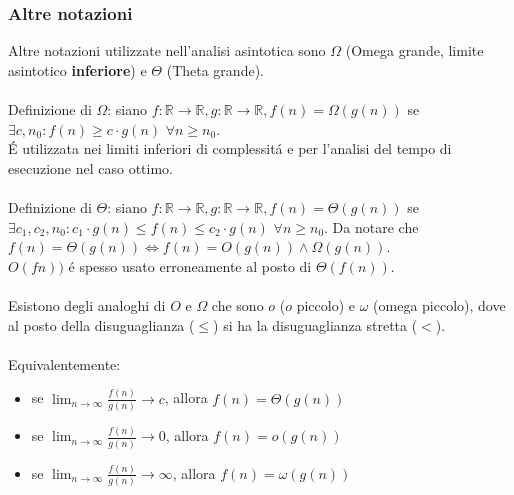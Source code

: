 \documentclass{article}
\begin{document}
\subsubsection{Altre notazioni}
Altre notazioni utilizzate nell'analisi asintotica sono $\Omega$ (Omega grande, limite asintotico \textbf{inferiore}) e $\Theta$ (Theta grande).\\\\
Definizione di $\Omega$: siano $f : \mathbb{R} \to \mathbb{R}, g : \mathbb{R} \to \mathbb{R}, f(n) = \Omega(g(n))$ se $\exists c, n_0 : f(n) \ge c \cdot g(n)$ $\forall n \ge n_0$.\\
É utilizzata nei limiti inferiori di complessitá e per l'analisi del tempo di esecuzione nel caso ottimo.\\\\
Definizione di $\Theta$: siano $f : \mathbb{R} \to \mathbb{R}, g : \mathbb{R} \to \mathbb{R}, f(n) = \Theta(g(n))$ se $\exists c_1, c_2, n_0 : c_1 \cdot g(n) \le f(n) \le c_2 \cdot g(n)$ $\forall n \ge n_0$. Da notare che $f(n) = \Theta(g(n)) \iff f(n) = O(g(n)) \wedge \Omega(g(n))$.\\
$O(fn))$ é spesso usato erroneamente al posto di $\Theta(f(n))$.\\\\
Esistono degli analoghi di $O$ e $\Omega$ che sono $o$ ($o$ piccolo) e $\omega$ (omega piccolo), dove al posto della disuguaglianza ($\le$) si ha la disuguaglianza stretta ($<$).\\\\
Equivalentemente:
\begin{itemize}
	\item[] se $\displaystyle \lim_{n \to \infty} \frac{f(n)}{g(n)} \to c$, allora $f(n) = \Theta(g(n))$
	\item[] se $\displaystyle \lim_{n \to \infty} \frac{f(n)}{g(n)} \to 0$, allora $f(n) = o(g(n))$
	\item[] se $\displaystyle \lim_{n \to \infty} \frac{f(n)}{g(n)} \to \infty$, allora $f(n) = \omega(g(n))$
\end{itemize}
\end{document}
